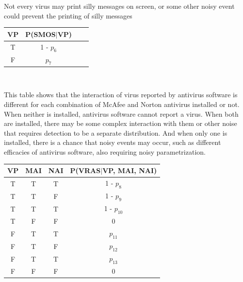 \documentclass[12pt,letterpaper]{article}
\begin{document}
\begin{enumerate}[label={(\alph*) }]
Not every virus may print silly messages on screen, or some other noisy event could prevent the printing of silly messages \\

\begin{minipage}{0.3\textwidth}
        \begin{tabular}{c c c c} %
        \hline\hline                        %
         VP & P(SMOS$|$VP) \\ [0.5ex] 
        \hline                  %
        T & 1 - $p_6$  \\ %
        F & $p_7$  \\[.5ex]      
        \hline 
        \end{tabular}

        \end{minipage}\qquad \\ \medskip

This table shows that the interaction of virus reported by antivirus software is different for each combination of McAfee and Norton antivirus installed or not. When neither is installed, antivirus software cannot report a virus. When both are installed, there may be some complex interaction with them or other noise that requires detection to be a separate distribution. And when only one is installed, there is a chance that noisy events may occur, such as different efficacies of antivirus software, also requiring noisy parametrization. \\

\begin{minipage}{0.3\textwidth}
        \begin{tabular}{c c c c} %
        \hline\hline                        %
         VP & MAI & NAI & P(VRAS$|$VP, MAI, NAI) \\ [0.5ex] 
        \hline                  %
        T & T & T & 1 - $p_8$  \\ %
        T & T & F & 1 - $p_9$  \\
        T & T & T & 1 - $p_{10}$  \\
        T & F & F & 0 \\
        F & T & T & $p_{11}$  \\
        F & T & F & $p_{12}$  \\
        F & T & T & $p_{13}$  \\
        F & F & F & 0  \\  
        \hline 
        \end{tabular}


\end{minipage}
\end{enumerate}
\end{document}
